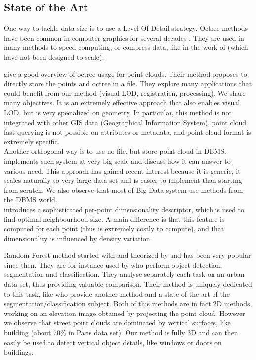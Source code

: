 	\subsection{State of the Art} 
		
		One way to tackle data size is to use a Level Of Detail strategy. Octree methods have been common in computer graphics for several decades \citep{Meagher1982}. They are used in many methods to speed computing, or compress data, like in the work of \cite{Schnabel2006,Huang2006} (which have not been designed to scale).
		
		\cite{Elseberg2013} give a good overview of octree usage for point clouds. Their method proposes to directly store the points and octree in a file. They explore many applications that could benefit from our method (visual LOD, registration, processing). We share many objectives. It is an extremely effective approach that also enables visual LOD, but is very specialized on geometry. In particular, this method is not integrated with other GIS data (Geographical Information System), point cloud fast querying is not possible on attributes or metadata, and point cloud format is extremely specific.
		\\
		Another orthogonal way is to use no file, but store point cloud in DBMS.  \cite{vanOosterom2014} implements such system at very big scale and discuss how it can answer to various need. This approach has gained recent interest \citep{pgPointCloud2014} because it is generic, it scales naturally to very large data set and is easier to implement than starting from scratch. We also observe that most of Big Data system use methods from the DBMS world.
		\\ 
		\cite{Demantke2014} introduces a sophisticated per-point dimensionality descriptor, which is used to find optimal neighbourhood size. A main difference is that this feature is computed for each point (thus is extremely costly to compute), and that dimensionality is influenced by density variation.
		
		Random Forest method started with \cite{Amit97shapequantization} and theorized by \cite{Breiman2001} and has been very popular since then. They are for instance used by \cite{Golovinskiy2009} who perform object detection, segmentation and classification. They analyse separately each task on an urban data set, thus providing valuable comparison. Their method is uniquely dedicated to this task, like \cite{Serna2014} who provide another method and a state of the art of the segmentation/classification subject.
		Both of this methods are in fact 2D methods, working on an elevation image obtained by projecting the point cloud. However we observe that street point clouds are dominated by vertical surfaces, like building (about 70\% in Paris data set). Our method is fully 3D and can then easily be used to detect vertical object details, like windows or doors on buildings.
		 
